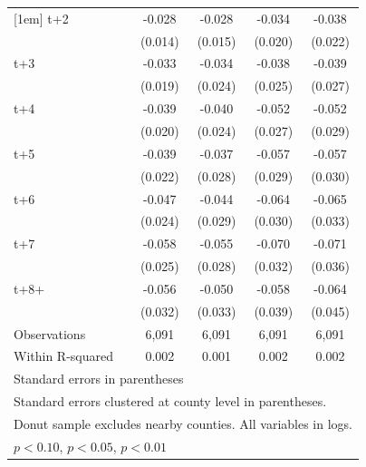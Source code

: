 \begin{table}[htbp]
\begin{tabular}{l*{4}{c}}
[1em]
t+2         &      -0.028\sym{**} &      -0.028\sym{*}  &      -0.034\sym{*}  &      -0.038\sym{*}  \\
            &     (0.014)         &     (0.015)         &     (0.020)         &     (0.022)         \\
[1em]
t+3         &      -0.033\sym{*}  &      -0.034         &      -0.038         &      -0.039         \\
            &     (0.019)         &     (0.024)         &     (0.025)         &     (0.027)         \\
[1em]
t+4         &      -0.039\sym{*}  &      -0.040\sym{*}  &      -0.052\sym{*}  &      -0.052\sym{*}  \\
            &     (0.020)         &     (0.024)         &     (0.027)         &     (0.029)         \\
[1em]
t+5         &      -0.039\sym{*}  &      -0.037         &      -0.057\sym{**} &      -0.057\sym{*}  \\
            &     (0.022)         &     (0.028)         &     (0.029)         &     (0.030)         \\
[1em]
t+6         &      -0.047\sym{*}  &      -0.044         &      -0.064\sym{**} &      -0.065\sym{**} \\
            &     (0.024)         &     (0.029)         &     (0.030)         &     (0.033)         \\
[1em]
t+7         &      -0.058\sym{**} &      -0.055\sym{**} &      -0.070\sym{**} &      -0.071\sym{*}  \\
            &     (0.025)         &     (0.028)         &     (0.032)         &     (0.036)         \\
[1em]
t+8+        &      -0.056\sym{*}  &      -0.050         &      -0.058         &      -0.064         \\
            &     (0.032)         &     (0.033)         &     (0.039)         &     (0.045)         \\
\hline
Observations&       6,091         &       6,091         &       6,091         &       6,091         \\
Within R-squared&       0.002         &       0.001         &       0.002         &       0.002         \\
\hline\hline
\multicolumn{5}{l}{\footnotesize Standard errors in parentheses}\\
\multicolumn{5}{l}{\footnotesize Standard errors clustered at county level in parentheses.}\\
\multicolumn{5}{l}{\footnotesize Donut sample excludes nearby counties. All variables in logs.}\\
\multicolumn{5}{l}{\footnotesize \sym{*} \(p<0.10\), \sym{**} \(p<0.05\), \sym{***} \(p<0.01\)}\\
\end{tabular}
\end{table}
